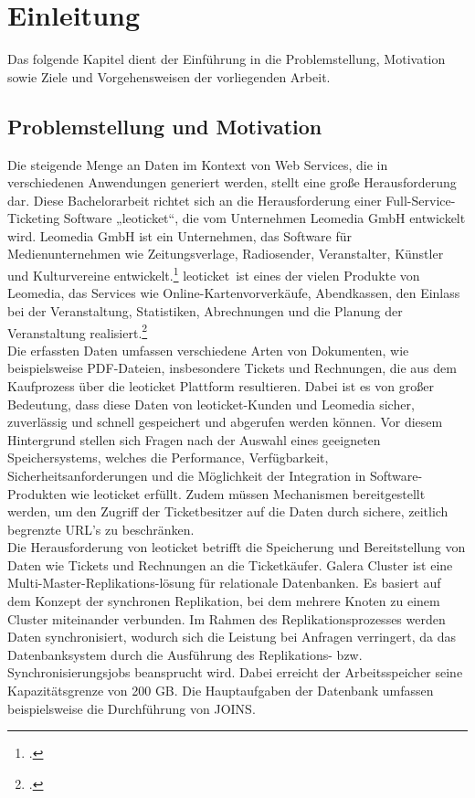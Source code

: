 \chapter{Einleitung}

Das folgende Kapitel dient der Einführung in die Problemstellung, Motivation sowie Ziele und Vorgehensweisen der vorliegenden Arbeit.

\section{Problemstellung und Motivation}

Die steigende Menge an Daten im Kontext von Web Services, die in verschiedenen Anwendungen generiert werden, stellt eine große Herausforderung dar. Diese Bachelorarbeit richtet sich an die Herausforderung einer Full-Service-Ticketing Software „leoticket“, die vom Unternehmen Leomedia GmbH entwickelt wird. 
Leomedia GmbH ist ein Unternehmen, das Software für Medienunternehmen wie Zeitungsverlage, Radiosender, Veranstalter, Künstler und Kulturvereine entwickelt.\footcite{leomedia-web}
\glqq leoticket\grqq\ ist eines der vielen Produkte von Leomedia, das Services wie Online-Kartenvorverkäufe, Abendkassen, den Einlass bei der Veranstaltung, Statistiken, Abrechnungen und die Planung der Veranstaltung realisiert.\footcite{leomedia-web}\\ 

Die erfassten Daten umfassen verschiedene Arten von Dokumenten, wie beispielsweise PDF-Dateien, insbesondere Tickets und Rechnungen, die aus dem Kaufprozess über die leoticket Plattform resultieren. Dabei ist es von großer Bedeutung, dass diese Daten von leoticket-Kunden und Leomedia sicher, zuverlässig und schnell gespeichert und abgerufen werden können. Vor diesem Hintergrund stellen sich Fragen nach der Auswahl eines geeigneten Speichersystems, welches die Performance, Verfügbarkeit, Sicherheitsanforderungen und die Möglichkeit der Integration in Software-Produkten wie leoticket erfüllt. Zudem müssen Mechanismen bereitgestellt werden, um den Zugriff der Ticketbesitzer auf die Daten durch sichere, zeitlich begrenzte URL’s zu beschränken.\\

Die Herausforderung von leoticket betrifft die Speicherung und Bereitstellung von Daten wie Tickets und Rechnungen an die Ticketkäufer. Galera Cluster ist eine Multi-Master-Replikations-lösung für relationale Datenbanken. Es basiert auf dem Konzept der synchronen Replikation, bei dem mehrere Knoten zu einem Cluster miteinander verbunden. Im Rahmen des Replikationsprozesses werden Daten synchronisiert, wodurch sich die Leistung bei Anfragen verringert, da das Datenbanksystem durch die Ausführung des Replikations- bzw. Synchronisierungsjobs beansprucht wird. Dabei erreicht der Arbeitsspeicher seine Kapazitätsgrenze von 200 GB. Die Hauptaufgaben der Datenbank umfassen beispielsweise die Durchführung von JOINS.\\ 

